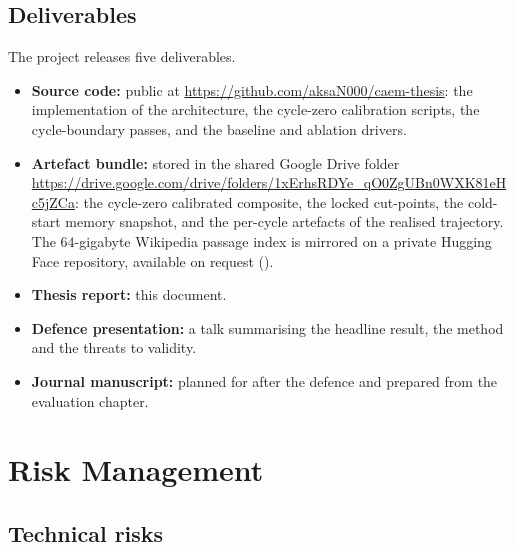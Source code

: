 \subsection{Deliverables}
\label{sec:pm-deliverables}

The project releases five deliverables.
\begin{itemize}
    \item \textbf{Source code:} public at \url{https://github.com/aksaN000/caem-thesis}: the implementation of the architecture, the cycle-zero calibration scripts, the cycle-boundary passes, and the baseline and ablation drivers.
    \item \textbf{Artefact bundle:} stored in the shared Google Drive folder \url{https://drive.google.com/drive/folders/1xErhsRDYe_qO0ZgUBn0WXK81eHc5jZCa}: the cycle-zero calibrated composite, the locked cut-points, the cold-start memory snapshot, and the per-cycle artefacts of the realised trajectory. The $64$-gigabyte Wikipedia passage index is mirrored on a private Hugging Face repository, available on request ().
    \item \textbf{Thesis report:} this document.
    \item \textbf{Defence presentation:} a talk summarising the headline result, the method and the threats to validity.
    \item \textbf{Journal manuscript:} planned for after the defence and prepared from the evaluation chapter.
\end{itemize}

\section{Risk Management}
\label{sec:risk}

\subsection{Technical risks}
\label{sec:risk-technical}

